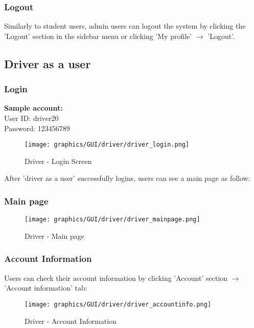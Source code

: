         \subsubsection{Logout} 
            \noindent Similarly to student users, admin users can logout the system by clicking the 'Logout' section in the sidebar menu or clicking 'My profile' $\rightarrow$ 'Logout'.
        \newpage
        
\subsection{Driver as a user}
    \subsubsection{Login}
\noindent \textbf{Sample account:} 
\\ User ID: driver20
\\ Password: 123456789

        \begin{figure}[H]
            \centering
            \texttt{[image: graphics/GUI/driver/driver\_login.png]}
            \caption{Driver - Login Screen}
        \label{fig:driver_loginscreen}
        \end{figure}
\noindent After 'driver as a user' successfully logins, users can see a main page as follow:
    \subsubsection{Main page}
        \begin{figure}[H]
            \centering
            \texttt{[image: graphics/GUI/driver/driver\_mainpage.png]}
            \caption{Driver - Main page}
        \label{fig:driver_mainpage}
        \end{figure}  
        
        
        \subsubsection{Account Information}
                \noindent Users can check their account information by clicking 'Account' section $\rightarrow$ 'Account information' tab:
                    \begin{figure}[H]
                        \centering
                        \texttt{[image: graphics/GUI/driver/driver\_accountinfo.png]}
                        \caption{Driver - Account Information}
                    \label{fig:driver_accountinfo}
                    \end{figure}
                
